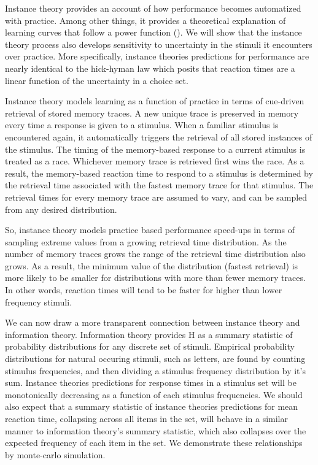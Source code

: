 \documentclass[floatsintext,man]{apa6}
\theoremstyle{definition}
\theoremstyle{definition}
\theoremstyle{definition}
\theoremstyle{remark}
\begin{document}
Instance theory provides an account of how performance becomes
automatized with practice. Among other things, it provides a theoretical
explanation of learning curves that follow a power function (). We will
show that the instance theory process also develops sensitivity to
uncertainty in the stimuli it encounters over practice. More
specifically, instance theories predictions for performance are nearly
identical to the hick-hyman law which posits that reaction times are a
linear function of the uncertainty in a choice set.

Instance theory models learning as a function of practice in terms of
cue-driven retrieval of stored memory traces. A new unique trace is
preserved in memory every time a response is given to a stimulus. When a
familiar stimulus is encountered again, it automatically triggers the
retrieval of all stored instances of the stimulus. The timing of the
memory-based response to a current stimulus is treated as a race.
Whichever memory trace is retrieved first wins the race. As a result,
the memory-based reaction time to respond to a stimulus is determined by
the retrieval time associated with the fastest memory trace for that
stimulus. The retrieval times for every memory trace are assumed to
vary, and can be sampled from any desired distribution.

So, instance theory models practice based performance speed-ups in terms
of sampling extreme values from a growing retrieval time distribution.
As the number of memory traces grows the range of the retrieval time
distribution also grows. As a result, the minimum value of the
distribution (fastest retrieval) is more likely to be smaller for
distributions with more than fewer memory traces. In other words,
reaction times will tend to be faster for higher than lower frequency
stimuli.

We can now draw a more transparent connection between instance theory
and information theory. Information theory provides H as a summary
statistic of probability distributions for any discrete set of stimuli.
Empirical probability distributions for natural occuring stimuli, such
as letters, are found by counting stimulus frequencies, and then
dividing a stimulus frequency distribution by it's sum. Instance
theories predictions for response times in a stimulus set will be
monotonically decreasing as a function of each stimulus frequencies. We
should also expect that a summary statistic of instance theories
predictions for mean reaction time, collapsing across all items in the
set, will behave in a similar manner to information theory's summary
statistic, which also collapses over the expected frequency of each item
in the set. We demonstrate these relationships by monte-carlo
simulation.
\end{document}
